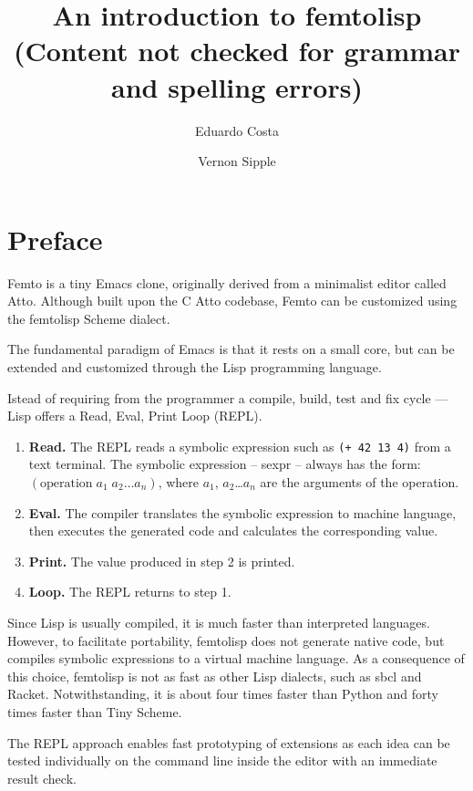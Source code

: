 \documentclass[a4paper,12pt]{book}
\title{An introduction to femtolisp\\
{\normalsize (Content not checked for grammar and spelling errors)}}
\author{Eduardo Costa \and Vernon Sipple}
\date{}
\begin{document}
\maketitle
\thispagestyle{empty}

\frontmatter

\chapter*{Preface}

Femto is a tiny Emacs clone,
 originally derived from a minimalist
editor called Atto. Although built
upon the C Atto codebase, Femto can
be customized using the femtolisp Scheme dialect.

The fundamental paradigm of Emacs is that it
rests on a small core, but can be
extended and customized through
the Lisp programming language.

Istead of requiring from the programmer a compile,
build, test and fix cycle ---
Lisp offers a Read, Eval, Print Loop (REPL).
\begin{enumerate}
\item {\bf Read.} The REPL reads
  a symbolic expression 
  such as \verb|(+ 42 13 4)| from
  a text terminal. The symbolic expression -- sexpr --
  always has the form: $(\textrm{operation}\;a_1\;a_2\ldots a_n)$,
  where $a_1$, $a_2$\ldots $a_n$ are the arguments of
  the operation.
\item {\bf Eval.} The compiler translates the symbolic
  expression to machine language, then executes the
  generated code and calculates the corresponding
  value.
\item {\bf Print.} The value produced in step 2 is printed.
\item {\bf Loop.} The REPL returns to step 1.
\end{enumerate}

 Since Lisp is usually compiled, it is
  much faster than interpreted languages.
  However, to facilitate portability,
  femtolisp does not generate
  native code, but compiles symbolic expressions
  to a virtual machine language. As a consequence of
  this choice, femtolisp is not as fast as other
  Lisp dialects, such as sbcl and Racket. Notwithstanding,
  it is about four times faster than Python
  and forty times faster than Tiny Scheme.

  The REPL approach enables fast prototyping
  of extensions as each idea can be tested
  individually on the command line inside
  the editor with an immediate result check.
\end{document}
